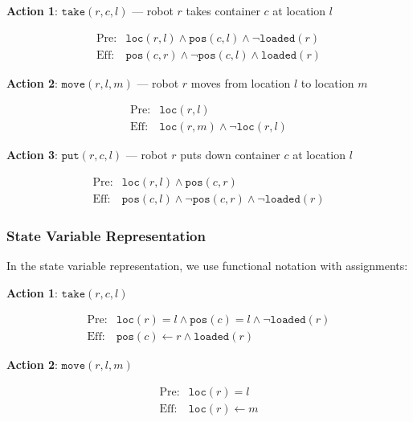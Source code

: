 \documentclass[11pt,a4paper]{article}
\theoremstyle{definition}
\theoremstyle{plain}
\theoremstyle{remark}
\begin{document}
\textbf{Action 1}: $\texttt{take}(r, c, l)$ — robot $r$ takes container $c$ at location $l$

\[
\begin{array}{ll}
\text{Pre:} & \texttt{loc}(r, l) \land \texttt{pos}(c, l) \land \neg \texttt{loaded}(r) \\
\text{Eff:} & \texttt{pos}(c, r) \land \neg \texttt{pos}(c, l) \land \texttt{loaded}(r)
\end{array}
\]

\textbf{Action 2}: $\texttt{move}(r, l, m)$ — robot $r$ moves from location $l$ to location $m$

\[
\begin{array}{ll}
\text{Pre:} & \texttt{loc}(r, l) \\
\text{Eff:} & \texttt{loc}(r, m) \land \neg \texttt{loc}(r, l)
\end{array}
\]

\textbf{Action 3}: $\texttt{put}(r, c, l)$ — robot $r$ puts down container $c$ at location $l$

\[
\begin{array}{ll}
\text{Pre:} & \texttt{loc}(r, l) \land \texttt{pos}(c, r) \\
\text{Eff:} & \texttt{pos}(c, l) \land \neg \texttt{pos}(c, r) \land \neg \texttt{loaded}(r)
\end{array}
\]

\subsubsection{State Variable Representation}

In the state variable representation, we use functional notation with assignments:

\textbf{Action 1}: $\texttt{take}(r, c, l)$

\[
\begin{array}{ll}
\text{Pre:} & \texttt{loc}(r) = l \land \texttt{pos}(c) = l \land \neg \texttt{loaded}(r) \\
\text{Eff:} & \texttt{pos}(c) \leftarrow r \land \texttt{loaded}(r)
\end{array}
\]

\textbf{Action 2}: $\texttt{move}(r, l, m)$

\[
\begin{array}{ll}
\text{Pre:} & \texttt{loc}(r) = l \\
\text{Eff:} & \texttt{loc}(r) \leftarrow m
\end{array}
\]
\end{document}
